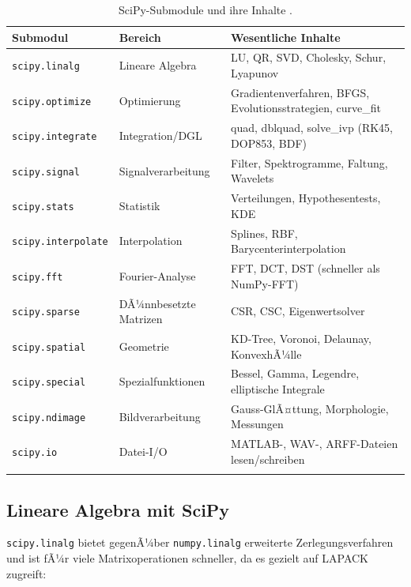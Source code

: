 \documentclass[12pt, a4paper]{article}
\begin{document}
\begin{center}
\begin{longtable}{p{4.5cm}p{3.5cm}p{5.5cm}}
  \toprule
  \textbf{Submodul} & \textbf{Bereich} & \textbf{Wesentliche Inhalte}\\
  \midrule
  \endhead
  \texttt{scipy.linalg}     & Lineare Algebra   & LU, QR, SVD, Cholesky, Schur, Lyapunov \\
  \texttt{scipy.optimize}   & Optimierung       & Gradientenverfahren, BFGS, Evolutionsstrategien, curve\_fit \\
  \texttt{scipy.integrate}  & Integration/DGL   & quad, dblquad, solve\_ivp (RK45, DOP853, BDF) \\
  \texttt{scipy.signal}     & Signalverarbeitung & Filter, Spektrogramme, Faltung, Wavelets \\
  \texttt{scipy.stats}      & Statistik         & Verteilungen, Hypothesentests, KDE \\
  \texttt{scipy.interpolate}& Interpolation     & Splines, RBF, Barycenterinterpolation \\
  \texttt{scipy.fft}        & Fourier-Analyse   & FFT, DCT, DST (schneller als NumPy-FFT) \\
  \texttt{scipy.sparse}     & DÃ¼nnbesetzte Matrizen & CSR, CSC, Eigenwertsolver \\
  \texttt{scipy.spatial}    & Geometrie         & KD-Tree, Voronoi, Delaunay, KonvexhÃ¼lle \\
  \texttt{scipy.special}    & Spezialfunktionen & Bessel, Gamma, Legendre, elliptische Integrale \\
  \texttt{scipy.ndimage}    & Bildverarbeitung  & Gauss-GlÃ¤ttung, Morphologie, Messungen \\
  \texttt{scipy.io}         & Datei-I/O         & MATLAB-, WAV-, ARFF-Dateien lesen/schreiben \\
  \bottomrule
  \caption{SciPy-Submodule und ihre Inhalte \cite{virtanen2020scipy}.}
  \label{tab:scipy_modules}
\end{longtable}
\end{center}

\subsection{Lineare Algebra mit SciPy}
\label{subsec:scipy-linalg}

\texttt{scipy.linalg} bietet gegenÃ¼ber \texttt{numpy.linalg} erweiterte
Zerlegungsverfahren und ist fÃ¼r viele Matrixoperationen schneller, da
es gezielt auf LAPACK zugreift:
\end{document}

